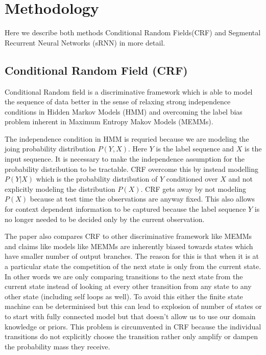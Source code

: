 \documentclass[letterpaper]{article} %
\begin{document}
\section{Methodology}
Here we describe both methods Conditional Random Fields(CRF) \cite{Lafferty:2001:CRF:645530.655813} and Segmental Recurrent Neural Networks (sRNN) \cite{DBLP:journals/corr/KongDS15} in more detail.
\subsection{Conditional Random Field (CRF)}
Conditional Random field is a discriminative framework which is able to model the sequence of data better in the sense of relaxing strong independence conditions in Hidden Markov Models (HMM) and overcoming the label bias problem inherent in Maximum Entropy Makov Models (MEMMs).

The independence condition in HMM is requried because we are modeling the joing probability distribution $P(Y, X)$. Here $Y$ is the label sequence and $X$ is the input sequence. It is necessary to make the independence assumption for the probability distribution to be tractable. CRF overcome this by instead modelling $P(Y|X)$ which is the probability distribution of $Y$ conditioned over $X$ and not explicitly modeling the distribution $P(X)$. CRF gets away by not modeling $P(X)$ because at test time the observations are anyway fixed. This also allows for context dependent information to be captured because the label sequence  $Y$ is no longer needed to be decided only by the current observation.

The paper also compares CRF to other discriminative framework like MEMMs and claims like models like MEMMs are inherently biased towards states which have smaller number of output branches. The reason for this is that when it is at a particular state the competition of the next state is only from the current state. In other words we are only comparing transitions to the next state from the current state instead of looking at every other transition from any state to any other state (including self loops as well). To avoid this either the finite state machine can be determinised but this can lead to explosion of number of states or to start with fully connected model but that doesn't allow us to use our domain knowledge or priors. This problem is circumvented in CRF because the individual transitions do not explicitly choose the transition rather only amplify or dampen the probability mass they receive.
\end{document}
